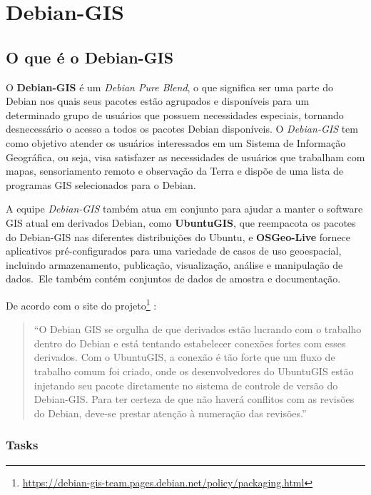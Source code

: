 \chapter{Debian-GIS}
\section{O que é o Debian-GIS}

O \textbf{Debian-GIS} é um \textit{Debian Pure Blend}, o que significa ser uma parte do Debian nos quais seus pacotes estão agrupados e disponíveis para um determinado grupo de usuários que possuem necessidades especiais, tornando desnecessário o acesso a todos os pacotes Debian disponíveis. O \textit{Debian-GIS} tem como objetivo atender os usuários interessados em um Sistema de Informação Geográfica, ou seja, visa satisfazer as necessidades de usuários que trabalham com mapas, sensoriamento remoto e observação da Terra e dispõe de uma lista de programas GIS selecionados para o Debian.

A equipe \textit{Debian-GIS} também atua em conjunto para ajudar a manter o software GIS atual em derivados Debian, como \textbf{UbuntuGIS}, que reempacota os pacotes do Debian-GIS nas diferentes distribuições do Ubuntu, e \textbf{OSGeo-Live} fornece aplicativos pré-configurados para uma variedade de casos de uso geoespacial, incluindo armazenamento, publicação, visualização, análise e manipulação de dados. Ele também contém conjuntos de dados de amostra e documentação.

De acordo com o site do projeto\footnote{\url{https://debian-gis-team.pages.debian.net/policy/packaging.html}} \cite{bib:gis}:

\begin{quote}
	``O Debian GIS se orgulha de que derivados estão lucrando com o trabalho dentro do Debian e está tentando estabelecer conexões fortes com esses derivados. Com o UbuntuGIS, a conexão é tão forte que um fluxo de trabalho comum foi criado, onde os desenvolvedores do UbuntuGIS estão injetando seu pacote diretamente no sistema de controle de versão do Debian-GIS. Para ter certeza de que não haverá conflitos com as revisões do Debian, deve-se prestar atenção à numeração das revisões.''
\end{quote}

\subsection{Tasks}

